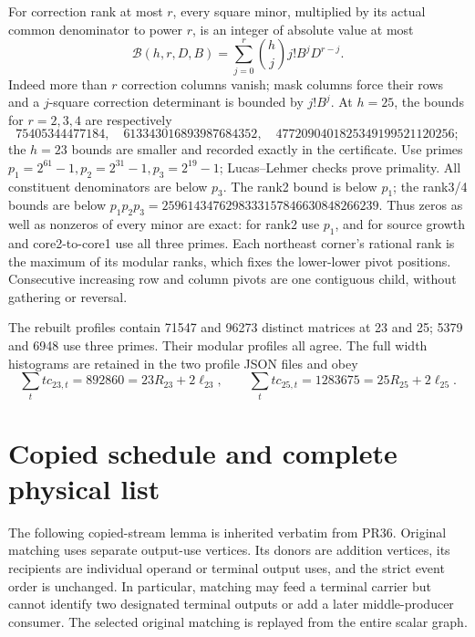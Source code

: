\documentclass[11pt]{article}
\begin{document}
For correction rank at most $r$, every square minor, multiplied by its
actual common denominator to power $r$, is an integer of absolute value
at most
\[
 \mathcal B(h,r,D,B)=\sum_{j=0}^r\binom hjj!B^jD^{r-j}.
\]
Indeed more than $r$ correction columns vanish; mask columns force their
rows and a $j$-square correction determinant is bounded by $j!B^j$.
At $h=25$, the bounds for $r=2,3,4$ are respectively
\[
75405344477184,\quad613343016893987684352,\quad
4772090401825349199521120256;
\]
the $h=23$ bounds are smaller and recorded exactly in the certificate.
Use primes $p_1=2^{61}-1,p_2=2^{31}-1,p_3=2^{19}-1$; Lucas--Lehmer checks
prove primality. All constituent denominators are below $p_3$.
The rank2 bound is below $p_1$; the rank3/4 bounds are below
$p_1p_2p_3=2596143476298333157846630848266239$.
Thus zeros as well as nonzeros of every minor are exact: for rank2 use
$p_1$, and for source growth and core2-to-core1 use all three primes.
Each northeast corner's rational rank is the maximum of its modular ranks,
which fixes the lower-lower pivot positions. Consecutive increasing row and
column pivots are one contiguous child, without gathering or reversal.

The rebuilt profiles contain 71547 and 96273 distinct matrices at 23 and 25;
5379 and 6948 use three primes. Their modular profiles all agree. The full
width histograms are retained in the two profile JSON files and obey
\[
 \sum_ttc_{23,t}=892860=23R_{23}+2\ell_{23},\qquad
 \sum_ttc_{25,t}=1283675=25R_{25}+2\ell_{25}.
\]

\section{Copied schedule and complete physical list}
The following copied-stream lemma is inherited verbatim from PR36.
Original matching uses separate output-use vertices. Its donors are
addition vertices, its recipients are individual operand or terminal
output uses, and the strict event order is unchanged. In particular,
matching may feed a terminal carrier but cannot identify two designated
terminal outputs or add a later middle-producer consumer. The selected
original matching is replayed from the entire scalar graph.

\end{document}

